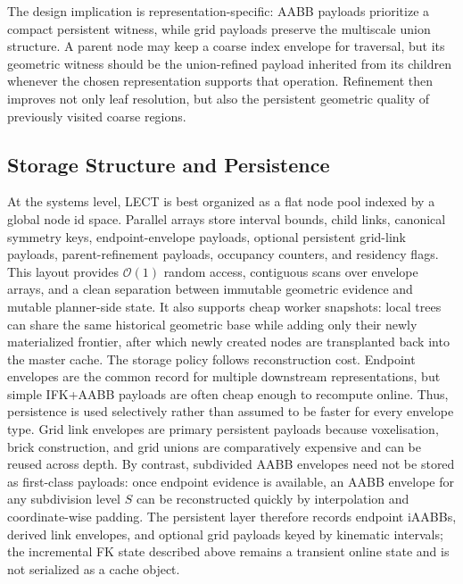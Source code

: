\documentclass[journal]{IEEEtran}
\begin{document}
The design implication is representation-specific: AABB payloads prioritize a
compact persistent witness, while grid payloads preserve the multiscale union
structure. A parent node may keep a coarse index envelope for traversal, but
its geometric witness should be the union-refined payload inherited from its
children whenever the chosen representation supports that operation.
Refinement then improves not only leaf resolution, but also the persistent
geometric quality of previously visited coarse regions.

\subsection{Storage Structure and Persistence}\label{sec:lect_storage}

At the systems level, LECT is best organized as a flat node pool indexed by a
global node id space. Parallel arrays store interval bounds, child links,
canonical symmetry keys, endpoint-envelope payloads, optional persistent
grid-link payloads, parent-refinement payloads, occupancy counters, and
residency flags. This layout provides
$\mathcal{O}(1)$ random access, contiguous scans over envelope arrays, and a
clean separation between immutable geometric evidence and mutable planner-side
state. It also supports cheap worker snapshots: local trees can share the same
historical geometric base while adding only their newly materialized frontier,
after which newly created nodes are transplanted back into the master cache.
The storage policy follows reconstruction cost. Endpoint envelopes are the
common record for multiple downstream representations, but simple IFK+AABB
payloads are often cheap enough to recompute online. Thus, persistence is used
selectively rather than assumed to be faster for every envelope type. Grid link
envelopes are primary persistent payloads because voxelisation, brick
construction, and grid unions are comparatively expensive and can be reused
across depth. By contrast, subdivided AABB envelopes need not be stored as
first-class payloads: once endpoint evidence is available, an AABB envelope for
any subdivision level $S$ can be reconstructed quickly by interpolation and
coordinate-wise padding. The persistent layer therefore records endpoint
iAABBs, derived link envelopes, and optional grid payloads keyed by kinematic
intervals; the incremental FK state described above remains a transient online
state and is not serialized as a cache object.
\end{document}
